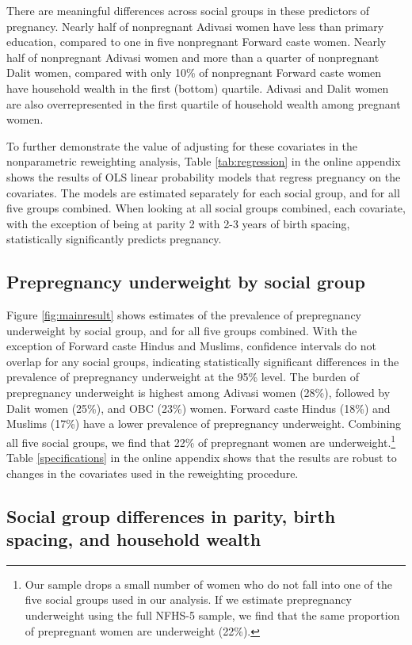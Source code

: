 \documentclass[12pt]{article}
\begin{document}
There are meaningful differences across social groups in these predictors of pregnancy. Nearly half of nonpregnant Adivasi women have less than primary education, compared to one in five nonpregnant Forward caste women. Nearly half of nonpregnant Adivasi women and more than a quarter of nonpregnant Dalit women, compared with only 10\% of nonpregnant Forward caste women have household wealth in the first (bottom) quartile. Adivasi and Dalit women are also overrepresented in the first quartile of household wealth among pregnant women.

To further demonstrate the value of adjusting for these covariates in the nonparametric reweighting analysis, Table \ref{tab:regression} in the online appendix shows the results of OLS linear probability models that regress pregnancy on the covariates.  The  models are estimated separately for each social group, and for all five groups combined. When looking at all social groups combined, each covariate, with the exception of being at parity 2 with 2-3 years of birth spacing, statistically significantly predicts pregnancy.

\subsection*{Prepregnancy underweight by social group}

Figure \ref{fig:mainresult} shows estimates of the prevalence of prepregnancy underweight by social group, and for all five groups combined. With the exception of Forward caste Hindus and Muslims, confidence intervals do not overlap for any social groups, indicating statistically significant differences in the prevalence of prepregnancy underweight at the 95\% level. The burden of prepregnancy underweight is highest among Adivasi women (28\%), followed by Dalit women (25\%), and OBC (23\%) women.  Forward caste Hindus (18\%) and Muslims (17\%) have a lower prevalence of prepregnancy underweight. Combining all five social groups, we find that 22\% of prepregnant women are underweight.\footnote{Our sample drops a small number of women who do not fall into one of the five social groups used in our analysis.  If we estimate prepregnancy underweight using the full NFHS-5 sample, we find that the same proportion of prepregnant women are underweight (22\%).} Table \ref{specifications} in the online appendix shows that the results are robust to changes in the covariates used in the reweighting procedure. 

\subsection*{Social group differences in parity, birth spacing, and household wealth}
\end{document}
